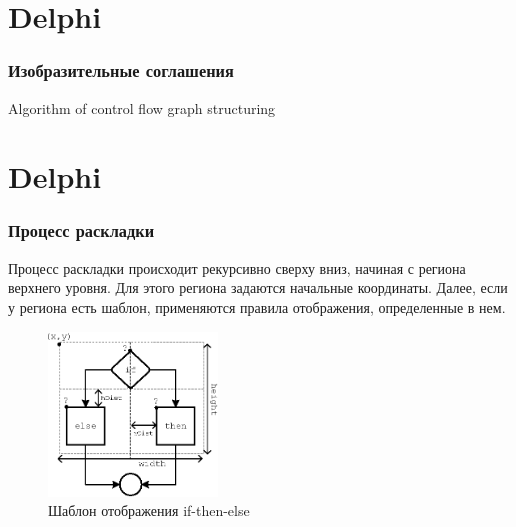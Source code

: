 \documentclass{beamer}
\begin{document}

\section{Delphi}
\begin{frame}
\frametitle{Изобразительные соглашения}
\small{%
\begin{algorithm}[H]
\SetAlgoLined %
\caption{Algorithm of control flow graph structuring}
\label{alg:struct}
\end{algorithm}%
}
\end{frame}


\section{Delphi}
\begin{frame}
\frametitle{Процесс раскладки}

\small{Процесс раскладки происходит рекурсивно сверху вниз, начиная с региона верхнего уровня. Для этого региона задаются начальные координаты. Далее, если у региона есть шаблон, применяются правила отображения, определенные в нем.}

\begin{figure}[htbp]
	\centering
		\includegraphics[width=0.4\textwidth]{Pic/IfThenElse.eps}
	\caption{Шаблон отображения if-then-else}
	\label{fig:IfThenElse}
\end{figure}

\end{frame}
\end{document}
